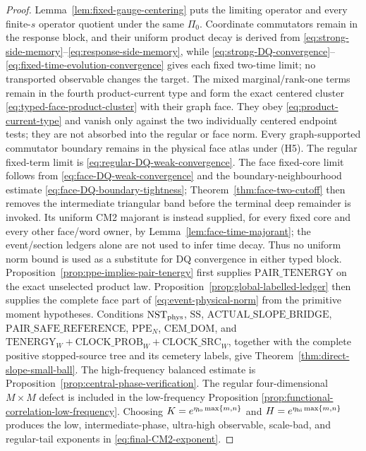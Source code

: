\documentclass[11pt]{article}
\begin{document}
\begin{proof}
Lemma~\ref{lem:fixed-gauge-centering} puts the limiting operator and every
finite-$s$ operator quotient under the same $\Pi_0$.  Coordinate
commutators remain in the response block, and their uniform product decay is
derived from \eqref{eq:strong-side-memory}--\eqref{eq:response-side-memory},
while \eqref{eq:strong-DQ-convergence}--
\eqref{eq:fixed-time-evolution-convergence} gives each fixed two-time limit; no
transported observable changes the target.  The mixed marginal/rank-one
terms remain in the fourth product-current type and form the exact centered
cluster \eqref{eq:typed-face-product-cluster} with their graph face.
They obey \eqref{eq:product-current-type} and vanish only against the two individually
centered endpoint tests; they are not absorbed into the regular or face
norm.  Every graph-supported
commutator boundary remains in the physical face atlas under \textup{(H5)}.
The regular fixed-term limit is
\eqref{eq:regular-DQ-weak-convergence}.  The face fixed-core limit follows
from \eqref{eq:face-DQ-weak-convergence} and the boundary-neighbourhood
estimate \eqref{eq:face-DQ-boundary-tightness};
Theorem~\ref{thm:face-two-cutoff} then removes the intermediate triangular
band before the terminal deep remainder is invoked.  Its uniform CM2
majorant is instead supplied, for every fixed core and every other
face/word owner, by Lemma~\ref{lem:face-time-majorant}; the event/section
ledgers alone are not used to infer time decay.
Thus no
uniform norm bound is used as a substitute for DQ convergence in either
typed block.
Proposition~\ref{prop:ppe-implies-pair-tenergy} first supplies
$\mathrm{PAIR\_TENERGY}$ on the exact unselected product law.
Proposition~\ref{prop:global-labelled-ledger} then supplies the complete face
part of \eqref{eq:event-physical-norm} from the primitive moment hypotheses.
Conditions $\mathrm{NST}_{\rm phys}$, $\mathrm{SS}$,
$\mathrm{ACTUAL\_SLOPE\_BRIDGE}$, $\mathrm{PAIR\_SAFE\_REFERENCE}$,
$\mathrm{PPE}_{N}$, $\mathrm{CEM\_DOM}$, and
$\mathrm{TENERGY}_{W}+\mathrm{CLOCK\_PROB}_{W}
+\mathrm{CLOCK\_SRC}_{W}$, together with the complete
positive stopped-source tree and its cemetery labels, give
Theorem~\ref{thm:direct-slope-small-ball}.  The high-frequency balanced
estimate is Proposition~\ref{prop:central-phase-verification}.  The regular
four-dimensional $M\times M$ defect is included in the low-frequency Proposition
\ref{prop:functional-correlation-low-frequency}.  Choosing
$K=e^{\eta_{\rm lo}\max\{m,n\}}$ and
$H=e^{\eta_{\rm hi}\max\{m,n\}}$ produces the low, intermediate-phase,
ultra-high observable, scale-bad, and regular-tail exponents in
\eqref{eq:final-CM2-exponent}.


\end{proof}
\end{document}
